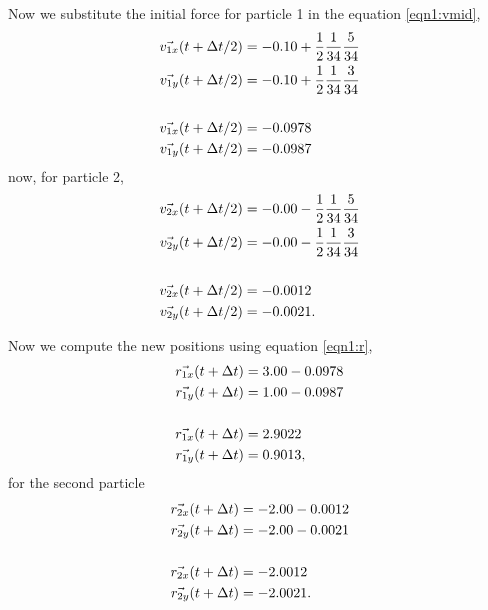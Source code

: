 \documentclass[main.tex]{subfiles}
\begin{document}
Now we substitute the initial force for particle 1 in the equation \eqref{eqn1:vmid},
\begin{align*}
    \vec{v_{1x}}\qty(t+\Delta t/2) &= -0.10 + \frac{1}{2}\frac{1}{34}\frac{5}{34} \\
    \vec{v_{1y}}\qty(t+\Delta t/2) &= -0.10 + \frac{1}{2}\frac{1}{34}\frac{3}{34} \\
    \\
    \vec{v_{1x}}\qty(t+\Delta t/2) &= -0.0978 \\
    \vec{v_{1y}}\qty(t+\Delta t/2) &= -0.0987 \\
\end{align*}
now, for particle 2,
\begin{align*}
    \vec{v_{2x}}\qty(t+\Delta t/2) &= -0.00 - \frac{1}{2}\frac{1}{34}\frac{5}{34} \\
    \vec{v_{2y}}\qty(t+\Delta t/2) &= -0.00 - \frac{1}{2}\frac{1}{34}\frac{3}{34} \\
    \\
    \vec{v_{2x}}\qty(t+\Delta t/2) &= -0.0012 \\
    \vec{v_{2y}}\qty(t+\Delta t/2) &= -0.0021.
\end{align*}

Now we compute the new positions using equation \eqref{eqn1:r},
\begin{align*}
    \vec{r_{1x}}\qty(t+\Delta t) &= 3.00 -0.0978 \\
    \vec{r_{1y}}\qty(t+\Delta t) &= 1.00 -0.0987 \\
    \\
    \vec{r_{1x}}\qty(t+\Delta t) &= 2.9022 \\
    \vec{r_{1y}}\qty(t+\Delta t) &= 0.9013,
\end{align*}
for the second particle
\begin{align*}
    \vec{r_{2x}}\qty(t+\Delta t) &= -2.00 -0.0012 \\
    \vec{r_{2y}}\qty(t+\Delta t) &= -2.00 -0.0021 \\
    \\
    \vec{r_{2x}}\qty(t+\Delta t) &= -2.0012 \\
    \vec{r_{2y}}\qty(t+\Delta t) &= -2.0021. 
\end{align*}
\end{document}
